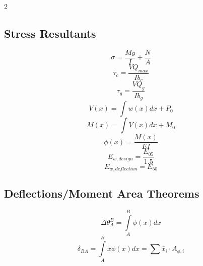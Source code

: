 \documentclass[14pt]{article}
\begin{document}
\begin{multicols}{2}
    \subsection{Stress Resultants}
    \begin{equation}
        \sigma=\frac{My}{I}+\frac{N}{A}
    \end{equation}
    \begin{equation}
        \tau_c = \frac{VQ_{max}}{Ib_c}
    \end{equation}
    \begin{equation}
        \tau_g = \frac{VQ_{g}}{Ib_g}
    \end{equation}
    \begin{equation}
        V(x)=\int w(x) dx + P_0
    \end{equation}
    \begin{equation}
        M(x)=\int V(x) dx + M_0
    \end{equation}
    \begin{equation}
        \phi(x) = \frac{M(x)}{EI}
    \end{equation}
    \begin{equation}
        E_{w, design}=\frac{E_{05}}{1.5}
    \end{equation}
    \begin{equation}
        E_{w, deflection}=E_{50}
    \end{equation}
    \subsection{Deflections/Moment Area Theorems}
    \begin{equation}
        \Delta \theta_A^B=\int \limits_{A}^{B} \phi (x) dx
    \end{equation}
    \begin{equation}
        \delta_{BA}=\int \limits_{A}^{B} x \phi(x)dx=\sum \bar{x}_i\cdot A_{\phi,i}
    \end{equation}

\end{multicols}
\end{document}
